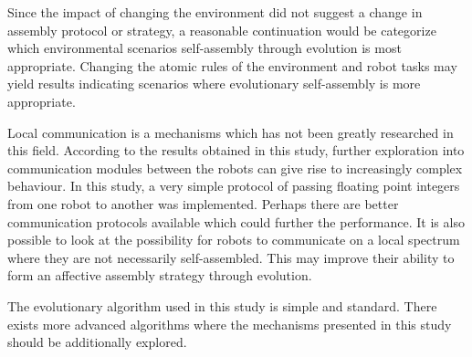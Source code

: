 Since the impact of changing the environment did not suggest a change in assembly protocol or strategy, a reasonable continuation would be categorize which environmental scenarios self-assembly through evolution is most appropriate. 
Changing the atomic rules of the environment and robot tasks may yield results indicating scenarios where evolutionary self-assembly is more appropriate.

Local communication is a mechanisms which has not been greatly researched in this field. 
According to the results obtained in this study, further exploration into communication modules between the robots can give rise to increasingly complex behaviour.
In this study, a very simple protocol of passing floating point integers from one robot to another was implemented.
Perhaps there are better communication protocols available which could further the performance.
It is also possible to look at the possibility for robots to communicate on a local spectrum where they are not necessarily self-assembled.
This may improve their ability to form an affective assembly strategy through evolution.

The evolutionary algorithm used in this study is simple and standard.
There exists more advanced algorithms where the mechanisms presented in this study should be additionally explored.
